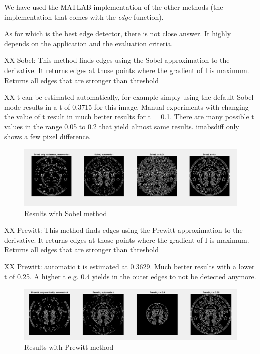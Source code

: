 We have used the MATLAB implementation
of the other methods (the implementation that comes with the \emph{edge} function).

As for which is the best edge detector, there is not close answer. It highly depends on the application and the evaluation criteria. 

XX Sobel: This method finds edges using the Sobel approximation to the derivative. It returns edges at those points where the gradient of I is maximum. Returns all edges that are stronger than threshold

XX t can be estimated automatically, for example simply using the default Sobel mode results in a t of 0.3715 for this image. Manual experiments with changing the value of t result in much better results for t = 0.1. There are many possible t values in the range 0.05 to 0.2 that yield almost same results. imabsdiff only shows a few pixel difference.

\begin{figure}[!hbt]
  \includegraphics[width=\textwidth]{./img/ex1/im1.png}
  \caption{Results with Sobel method}
  \label{fig:im1}
\end{figure}

XX Prewitt: This method finds edges using the Prewitt approximation to the derivative. It returns edges at those points where the gradient of I is maximum. Returns all edges that are stronger than threshold

XX Prewitt: automatic t is estimated at 0.3629. Much better results with a lower t of 0.25. A higher t e.g. 0.4 yields in the outer edges to not be detected anymore.

\begin{figure}[!hbt]
  \includegraphics[width=\textwidth]{./img/ex1/im2.png}
  \caption{Results with Prewitt method}
  \label{fig:im2}
\end{figure}

